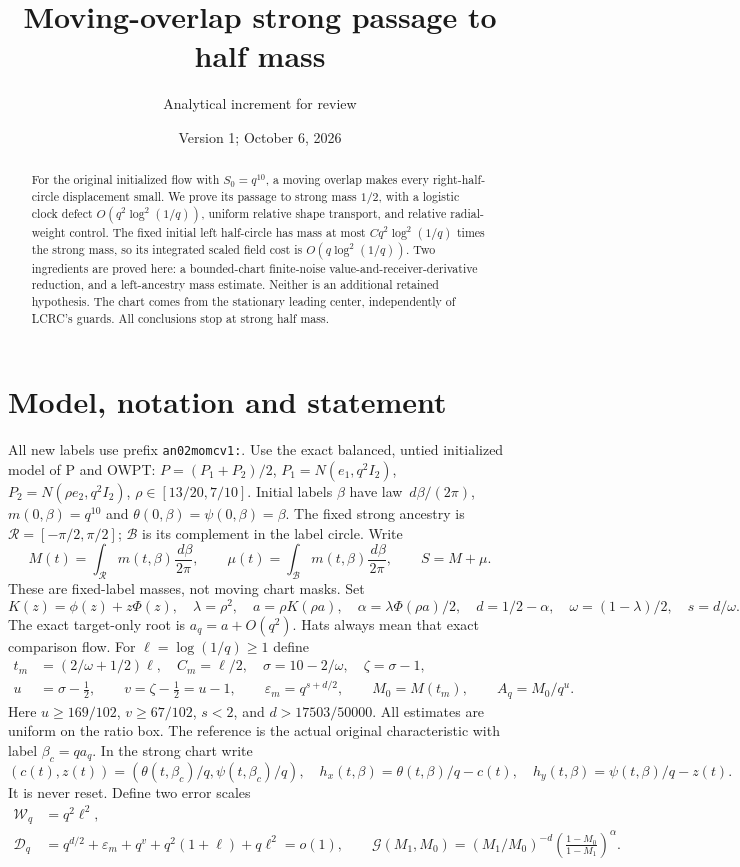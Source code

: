 \documentclass[11pt]{article}
\title{Moving-overlap strong passage to half mass}
\author{Analytical increment for review}
\date{Version 1; October 6, 2026}
\theoremstyle{remark}\newtheorem{remark}[theorem]{Remark}
\newcommand{\dd}{\,d}
\newcommand{\Rhalf}{\mathcal R}
\newcommand{\Lhalf}{\mathcal B}
\newcommand{\eps}{\varepsilon}
\begin{document}
\maketitle
\begin{abstract}
For the original initialized flow with $S_0=q^{10}$, a moving
overlap makes every right-half-circle displacement small.
We prove its passage to strong mass $1/2$, with a logistic clock
defect $O(q^2\log^2(1/q))$, uniform relative shape transport,
and relative radial-weight control. The fixed initial left half-circle
has mass at most $Cq^2\log^2(1/q)$ times the strong mass, so its
integrated scaled field cost is $O(q\log^2(1/q))$.
Two ingredients are proved here: a bounded-chart finite-noise
value-and-receiver-derivative reduction, and a left-ancestry
mass estimate. Neither is an additional retained hypothesis.
The chart comes from the stationary leading center, independently
of LCRC's guards. All conclusions stop at strong half mass.
\end{abstract}

\section{Model, notation and statement}
All new labels use prefix \texttt{an02momcv1:}.
Use the exact balanced, untied initialized model of P and OWPT:
$P=(P_1+P_2)/2$, $P_1=N(e_1,q^2I_2)$,
$P_2=N(\rho e_2,q^2I_2)$, $\rho\in[13/20,7/10]$.
Initial labels $\beta$ have law $\dd\beta/(2\pi)$,
$m(0,\beta)=q^{10}$ and $\theta(0,\beta)=\psi(0,\beta)=\beta$.
The fixed strong ancestry is $\Rhalf=[-\pi/2,\pi/2]$;
$\Lhalf$ is its complement in the label circle. Write
\[
 M(t)=\int_{\Rhalf}m(t,\beta)\frac{\dd\beta}{2\pi},\qquad
 \mu(t)=\int_{\Lhalf}m(t,\beta)\frac{\dd\beta}{2\pi},
 \qquad S=M+\mu .
\]
These are fixed-label masses, not moving chart masks.
Set
\[
 K(z)=\phi(z)+z\Phi(z),\quad \lambda=\rho^2,\quad
 a=\rho K(\rho a),\quad \alpha=\lambda\Phi(\rho a)/2,\quad
 d=1/2-\alpha,\quad \omega=(1-\lambda)/2,\quad s=d/\omega .
\]
The exact target-only root is $a_q=a+O(q^2)$.
Hats always mean that exact comparison flow.
For $\ell=\log(1/q)\ge1$ define
\begin{align}
 t_m&=(2/\omega+1/2)\ell,\quad C_m=\ell/2,\quad
 \sigma=10-2/\omega,\quad \zeta=\sigma-1,\nonumber\\
 u&=\sigma-\tfrac12,\qquad v=\zeta-\tfrac12=u-1,\qquad
 \eps_m=q^{s+d/2},\qquad M_0=M(t_m),\qquad
 A_q=M_0/q^u. \label{an02momcv1:scales}
\end{align}
Here $u\ge169/102$, $v\ge67/102$, $s<2$, and
$d>17503/50000$. All estimates are uniform on the ratio box.
The reference is the actual original characteristic with label
$\beta_c=qa_q$. In the strong chart write
\[
 (c(t),z(t))=(\theta(t,\beta_c)/q,\psi(t,\beta_c)/q),\quad
 h_x(t,\beta)=\theta(t,\beta)/q-c(t),\quad
 h_y(t,\beta)=\psi(t,\beta)/q-z(t).
\]
It is never reset. Define two error scales
\begin{align}
 \mathcal W_q&=q^2\ell^2,\nonumber\\
 \mathcal D_q&=q^{d/2}+\eps_m+q^v+q^2(1+\ell)+q\ell^2=o(1),
 \qquad
 \mathcal G(M_1,M_0)=
 (M_1/M_0)^{-d}\left(\frac{1-M_0}{1-M_1}\right)^\alpha .
 \label{an02momcv1:errors}
\end{align}
\end{document}
